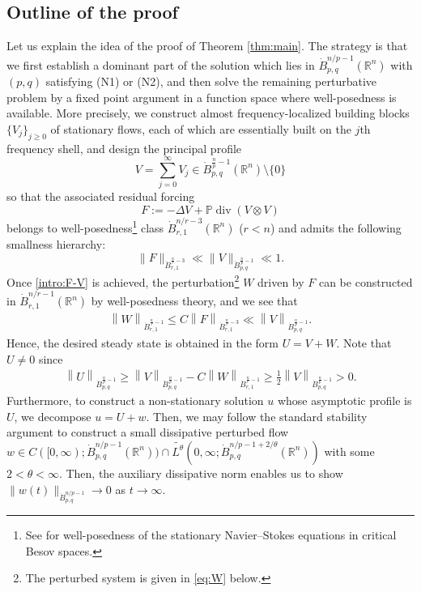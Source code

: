 \documentclass[a4paper,12pt,reqno]{amsart}
\theoremstyle{plain}
\theoremstyle{definition}
\renewcommand{\div}{\operatorname{div}}
\newcommand{\dB}{\dot{B}}
\renewcommand{\leq}{\leqslant}
\renewcommand{\geq}{\geqslant}
\newcommand{\n}[1]{{\left\|#1\right\|}}
\newcommand{\R}{\mathbb{R}}
\begin{document}
\subsection{Outline of the proof}\label{subsec:idea}
Let us explain the idea of the proof of Theorem \ref{thm:main}.
The strategy is that we first establish a dominant part of the solution which lies in $\dB_{p,q}^{n/p-1}(\R^n)$ with $(p,q)$ satisfying (N1) or (N2), and then solve the remaining perturbative problem by a fixed point argument
in a function space where well-posedness is available.
More precisely, we construct almost frequency-localized building blocks $\{V_j\}_{j\geq0}$ of stationary flows, each of which are essentially built on the
$j$th frequency shell, and design the principal profile
\begin{equation}\label{intro:V}
  V = \sum_{j=0}^{\infty} V_j \in \dot{B}_{p,q}^{\frac np-1}(\mathbb{R}^n)\setminus \{0\}
\end{equation}
so that the associated residual forcing
\begin{equation}\label{intro:defF}
  F := -\Delta V + \mathbb{P}\div (V\otimes V)
\end{equation}
belongs to well-posedness\footnote{See \cite{Kan-Koz-Shi-19} for well-posedness of the stationary Navier--Stokes equations in critical Besov spaces.} class $\dB_{r,1}^{n/r-3}(\R^n)$ ($r<n$) and admits the following smallness hierarchy:
\begin{equation}\label{intro:F-V}
  \|F\|_{\dot{B}_{r,1}^{\frac nr-3}} 
  \ll 
  \|V\|_{\dot{B}_{p,q}^{\frac np-1}} 
  \ll 
  1.
\end{equation}
Once \eqref{intro:F-V} is achieved, the perturbation\footnote{The perturbed system is given in \eqref{eq:W} below.} $W$ driven by $F$ can be constructed in
$\dot{B}_{r,1}^{n/r-1}(\mathbb{R}^n)$ by well-posedness theory, and we see that 
\begin{align}
    \n{W}_{\dB_{r,1}^{\frac{n}{r}-1}} \leq C\n{F}_{\dB_{r,1}^{\frac{n}{r}-3}} \ll \n{V}_{\dB_{p,q}^{\frac{n}{p}-1}}.
\end{align}
Hence, the desired steady state is obtained in the form $U = V + W$.
Note that $U \neq 0$ since 
\begin{align}
    \n{U}_{\dB_{p,q}^{\frac{n}{p}-1}} \geq \n{V}_{\dB_{p,q}^{\frac{n}{p}-1}} - C\n{W}_{\dB_{r,1}^{\frac{n}{r}-1}} \geq \frac{1}{2}\n{V}_{\dB_{p,q}^{\frac{n}{p}-1}} > 0.
\end{align}
Furthermore, to construct a non-stationary solution $u$ whose asymptotic profile is $U$, we decompose $u=U+w$.
Then, we may follow the standard stability argument to construct a small dissipative perturbed flow
$w \in C([0,\infty);\dot{B}_{p,q}^{n/p-1}(\mathbb{R}^n)) \cap \widetilde{L^\theta}(0,\infty;\dot{B}_{p,q}^{n/p - 1 + 2/\theta}(\mathbb{R}^n))$ with some $2<\theta<\infty$.
Then, the auxiliary dissipative norm enables us to show
$\|w(t)\|_{\dot{B}_{p,q}^{n/p-1}}\to0$ as $t\to\infty$.
\end{document}
